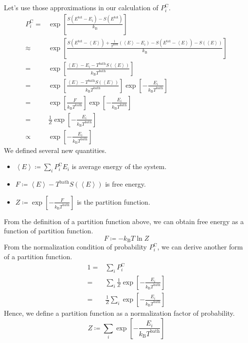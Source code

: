 \documentclass[a4paper,11pt]{article}
\begin{document}
Let's use those approximations in our calculation of $P^\mathrm{C}_i$.
\begin{align*}
  P^\mathrm{C}_i
  =&
  \exp 
  \left[
    \frac{S(E^\mathrm{tot} - E_i) - S(E^\mathrm{tot})}{k_\mathrm{B}} 
  \right]
  \\\approx&
  \exp 
  \left[
    \frac
    {
      S(E^\mathrm{tot} - \left<E\right>)
      +
      \frac{1}{T^\mathrm{bath}}
      (\left<E\right> - E_i)
      -
      S(E^\mathrm{tot}-\left<E\right>)
      -
      S(\left<E\right>)
    }
    {k_\mathrm{B}} 
  \right]
  \\=&
  \exp 
  \left[
    \frac
    {
      \left<E\right> 
      - 
      E_i
      -
      T^\mathrm{bath}S(\left<E\right>)
    }
    {k_\mathrm{B} T^\mathrm{bath}} 
  \right]
  \\=&
  \exp 
  \left[
    \frac
    {
      \left<E\right> 
      -
      T^\mathrm{bath}S(\left<E\right>)
    }
    {k_\mathrm{B} T^\mathrm{bath}} 
  \right]
  \exp 
  \left[
    -
    \frac
    {E_i}
    {k_\mathrm{B} T^\mathrm{bath}} 
  \right]
  \\=&
  \exp 
  \left[
    \frac
    {F}
    {k_\mathrm{B} T^\mathrm{bath}} 
  \right]
  \exp 
  \left[
    -
    \frac
    {E_i}
    {k_\mathrm{B} T^\mathrm{bath}} 
  \right]
  \\=&
  \frac{1}{Z}
  \exp 
  \left[
    -
    \frac
    {E_i}
    {k_\mathrm{B} T^\mathrm{bath}} 
  \right]
  \\\propto&
  \exp 
  \left[
    -
    \frac
    {E_i}
    {k_\mathrm{B} T^\mathrm{bath}} 
  \right]
\end{align*}
We defined several new quantities. 
\begin{itemize}
  \item $\left<E\right> 
  \coloneqq 
  \sum_i P^\mathrm{C}_i E_i$ is average energy of the system.
  \item $F 
  \coloneqq 
  \left<E\right> 
  - T^\mathrm{bath}S(\left<E\right>)$ is free energy.
  \item $Z \coloneqq \exp
  \left[
    -
    \frac
    {F}
    {k_\mathrm{B} T^\mathrm{bath}} 
  \right]$ is the partition function.
\end{itemize}
From the definition of a partition function above, 
we can obtain free energy as a function of partition function.
\begin{equation*}
  F \coloneqq - k_\mathrm{B}T \ln Z
\end{equation*}
From the normalization condition of probability $P^\mathrm{C}_i$, 
we can derive another form of a partition function.
\begin{align*}
  1 
  =& 
  \sum_i 
  P^\mathrm{C}_i
  \\=&
  \sum_i 
  \frac{1}{Z}
  \exp 
  \left[
    -
    \frac
    {E_i}
    {k_\mathrm{B} T^\mathrm{bath}} 
  \right]
  \\=&
  \frac{1}{Z}
  \sum_i 
  \exp 
  \left[
    -
    \frac
    {E_i}
    {k_\mathrm{B} T^\mathrm{bath}} 
  \right]
\end{align*}
Hence, we define a partition function as a normalization factor of 
probability.
\begin{equation*}
  Z 
  \coloneqq 
  \sum_i 
  \exp 
  \left[
    -
    \frac
    {E_i}
    {k_\mathrm{B} T^\mathrm{bath}} 
  \right]
\end{equation*}
\end{document}
